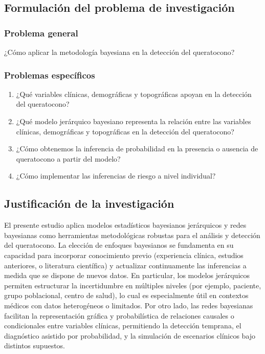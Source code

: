 \subsection{Formulación del problema de investigación}
\subsubsection{Problema general}
¿Cómo aplicar la metodología bayesiana en la detección del queratocono?

\subsubsection{Problemas específicos}
\begin{enumerate}
\item ¿Qué variables clínicas, demográficas y topográficas apoyan en la detección del queratocono?
\item ¿Qué modelo jerárquico bayesiano representa la relación entre las variables clínicas, demográficas y topográficas en la detección del queratocono?
\item ¿Cómo obtenemos la inferencia de probabilidad en la presencia o ausencia de queratocono a partir del modelo?
\item ¿Cómo implementar las inferencias de riesgo a nivel individual?
\end{enumerate}

\subsection{Justificación de la investigación}
El presente estudio aplica modelos estadísticos bayesianos jerárquicos y redes bayesianas como herramientas metodológicas robustas para el análisis y detección del queratocono. La elección de enfoques bayesianos se fundamenta en su capacidad para incorporar conocimiento previo (experiencia clínica, estudios anteriores, o literatura científica) y actualizar continuamente las inferencias a medida que se dispone de nuevos datos. En particular, los modelos jerárquicos permiten estructurar la incertidumbre en múltiples niveles (por ejemplo, paciente, grupo poblacional, centro de salud), lo cual es especialmente útil en contextos médicos con datos heterogéneos o limitados. Por otro lado, las redes bayesianas facilitan la representación gráfica y probabilística de relaciones causales o condicionales entre variables clínicas, permitiendo la detección temprana, el diagnóstico asistido por probabilidad, y la simulación de escenarios clínicos bajo distintos supuestos.

